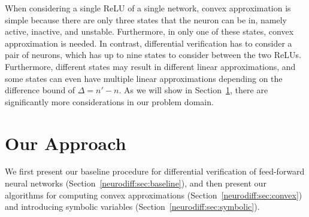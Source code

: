 When considering a single ReLU of a single network, convex
approximation is simple because there are only three states that the
neuron can be in, namely active, inactive, and unstable. Furthermore,
in only one of these states, convex approximation is needed.
%
In contrast, differential verification has to consider a pair of
neurons, which has up to nine states to consider between the two
ReLUs.  Furthermore, different states may result in different linear
approximations, and some states can even have multiple linear
approximations depending on the difference bound of $ \Delta = n' - n
$. As we will show in Section~\ref{neurodiff:sec:approach}, there are
significantly more considerations in our problem domain.




\section{Our Approach}
\label{neurodiff:sec:approach}

We first present our baseline procedure for differential verification
of feed-forward neural networks (Section~\ref{neurodiff:sec:baseline}), and then
present our algorithms for computing convex approximations
(Section~\ref{neurodiff:sec:convex}) and introducing symbolic variables
(Section~\ref{neurodiff:sec:symbolic}).


